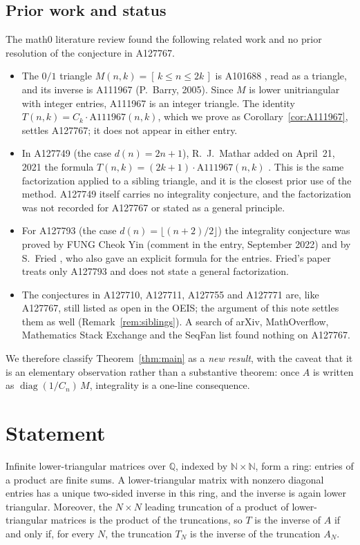 \documentclass[11pt]{amsart}
\theoremstyle{plain}
\theoremstyle{definition}
\newcommand{\N}{\mathbb{N}}
\newcommand{\Q}{\mathbb{Q}}
\newcommand{\ib}[1]{[\,#1\,]}
\newcommand{\diag}{\operatorname{diag}}
\begin{document}
\subsection*{Prior work and status}
The math0 literature review found the following related work and no prior resolution of the conjecture in A127767.
\begin{itemize}
\item The $0/1$ triangle $M(n,k)=\ib{k\le n\le 2k}$ is A101688 \cite{A101688}, read as a triangle, and its inverse is A111967 \cite{A111967} (P.~Barry, 2005). Since $M$ is lower unitriangular with integer entries, A111967 is an integer triangle. The identity $T(n,k)=C_k\cdot\mathrm{A111967}(n,k)$, which we prove as Corollary~\ref{cor:A111967}, settles A127767; it does not appear in either entry.
\item In A127749 (the case $d(n)=2n+1$), R.~J.~Mathar added on April~21, 2021 the formula $T(n,k)=(2k+1)\cdot\mathrm{A111967}(n,k)$ \cite{A127749}. This is the same factorization applied to a sibling triangle, and it is the closest prior use of the method. A127749 itself carries no integrality conjecture, and the factorization was not recorded for A127767 or stated as a general principle.
\item For A127793 (the case $d(n)=\lfloor(n+2)/2\rfloor$) the integrality conjecture was proved by FUNG Cheok Yin (comment in the entry, September 2022) and by S.~Fried \cite{Fried}, who also gave an explicit formula for the entries. Fried's paper treats only A127793 and does not state a general factorization.
\item The conjectures in A127710, A127711, A127755 and A127771 are, like A127767, still listed as open in the OEIS; the argument of this note settles them as well (Remark~\ref{rem:siblings}). A search of arXiv, MathOverflow, Mathematics Stack Exchange and the SeqFan list found nothing on A127767.
\end{itemize}
We therefore classify Theorem~\ref{thm:main} as a \emph{new result}, with the caveat that it is an elementary observation rather than a substantive theorem: once $A$ is written as $\diag(1/C_n)\,M$, integrality is a one-line consequence.

\section{Statement}\label{sec:statement}

Infinite lower-triangular matrices over $\Q$, indexed by $\N\times\N$, form a ring: entries of a product are finite sums. A lower-triangular matrix with nonzero diagonal entries has a unique two-sided inverse in this ring, and the inverse is again lower triangular. Moreover, the $N\times N$ leading truncation of a product of lower-triangular matrices is the product of the truncations, so $T$ is the inverse of $A$ if and only if, for every $N$, the truncation $T_N$ is the inverse of the truncation $A_N$.
\end{document}
